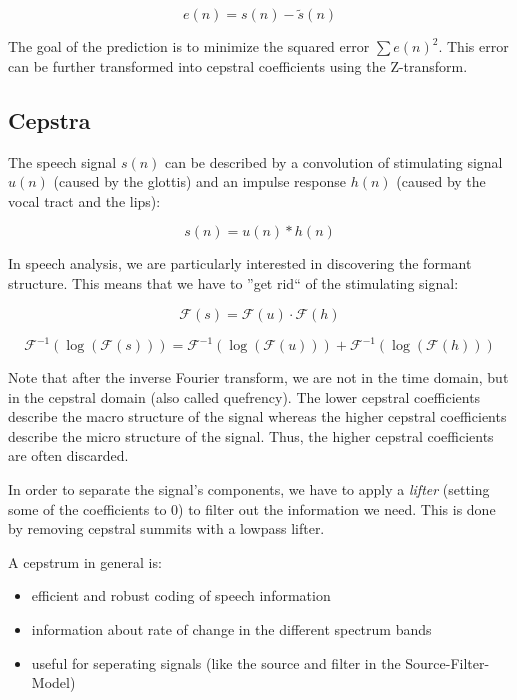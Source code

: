 \begin{equation}
    e(n) = s(n) - \tilde{s}(n)
\end{equation}

The goal of the prediction is to minimize the squared error $\sum e(n)^2$. This error can be further transformed into cepstral coefficients using the Z-transform.

\subsection{Cepstra}

The speech signal $s(n)$ can be described by a convolution of stimulating signal $u(n)$ (caused by the glottis) and an impulse response $h(n)$ (caused by the vocal tract and the lips):

\begin{equation}
    s(n) = u(n) \ast h(n)
\end{equation}

In speech analysis, we are particularly interested in discovering the formant structure. This means that we have to ''get rid`` of the stimulating signal:

\begin{equation}
    \mathcal{F}(s) = \mathcal{F}(u) \cdot \mathcal{F}(h)
\end{equation}

\begin{equation}
    \mathcal{F}^{-1}(\log(\mathcal{F}(s))) = \mathcal{F}^{-1}(\log(\mathcal{F}(u))) + \mathcal{F}^{-1}(\log(\mathcal{F}(h)))
\end{equation}

Note that after the inverse Fourier transform, we are not in the time domain, but in the cepstral domain (also called quefrency). The lower cepstral coefficients describe the macro structure of the signal whereas the higher cepstral coefficients describe the micro structure of the signal. Thus, the higher cepstral coefficients are often discarded.

In order to separate the signal's components, we have to apply a \textit{lifter} (setting some of the coefficients to 0) to filter out the information we need. This is done by removing cepstral summits with a lowpass lifter.

A cepstrum in general is:
\begin{itemize}
\item efficient and robust coding of speech information
\item information about rate of change in the different spectrum bands
\item useful for seperating signals (like the source and filter in the Source-Filter-Model)
\end{itemize}


